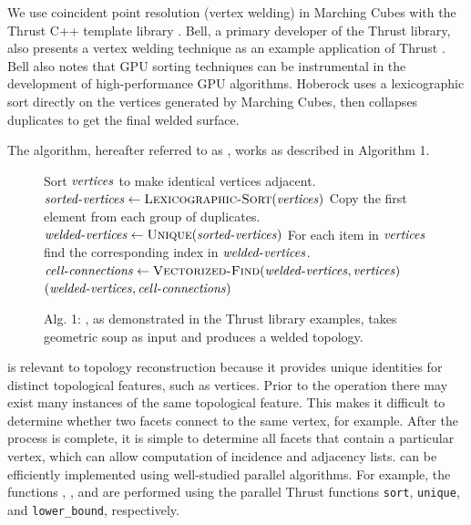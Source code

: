 \documentclass[10pt,journal,cspaper,compsoc]{IEEEtran}
\begin{document}
We use coincident point resolution (vertex welding) in Marching Cubes with the Thrust
C++ template library \cite{Bell2012}. Bell, a primary
developer of the Thrust library, also presents a vertex welding technique as an
example application of Thrust \cite{Bell2010}. Bell also notes that GPU sorting techniques can
be instrumental in the development of high-performance GPU algorithms. Hoberock uses a
lexicographic sort directly on the vertices generated by Marching Cubes, then collapses 
duplicates to get the final welded surface.

The algorithm, hereafter referred to as , works as described in Algorithm 1.
\begin{figure}[h!]
\vspace{-0.3cm}
\begin{codebox}
  \zi \Comment Sort $\id{vertices}$ to make identical vertices adjacent.
  \li $\id{sorted-vertices} \gets \proc{Lexicographic-Sort}(\id{vertices})$
  \zi \Comment Copy the first element from each group of duplicates.
  \li $\id{welded-vertices} \gets \proc{Unique}(\id{sorted-vertices})$
  \zi \Comment For each item in $\id{vertices}$ find the corresponding index
  \zi \Comment in $\id{welded-vertices}$.
  \li $\id{cell-connections} \gets \proc{Vectorized-Find}(\id{welded-vertices},\id{vertices})$
  \li \Return $( \id{welded-vertices}, \id{cell-connections} )$
\end{codebox}
\vspace{-0.5cm}
\caption*{Alg. 1: , as demonstrated in the Thrust library examples, takes geometric soup as input and produces a welded topology.}
\end{figure}

 is relevant to topology reconstruction because it provides unique identities for distinct topological features, such as vertices. Prior to the operation there may exist many instances of the same topological feature. This makes it difficult to determine whether two facets connect to the same vertex, for example. After the  process is complete, it is simple to determine all facets that contain a particular vertex, which can allow computation of incidence and adjacency lists.   can be efficiently implemented using well-studied parallel algorithms.  For example, the functions ,
, and  are performed using the parallel
Thrust functions \texttt{sort}, \texttt{unique}, and \texttt{lower\_bound},
respectively.
\end{document}
